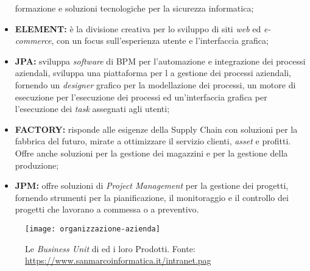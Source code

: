 \begin{itemize}
formazione e soluzioni tecnologiche per la sicurezza informatica;
\item \textbf{ELEMENT:} è la divisione creativa per lo sviluppo di siti \textit{web} ed \textit{e-commerce}, con un focus sull'esperienza utente e 
l'interfaccia grafica;
\item \textbf{JPA:} sviluppa \textit{software} di \gls{BPM} per l'automazione e integrazione dei processi aziendali, sviluppa una piattaforma per l
a gestione dei processi aziendali, fornendo un \textit{designer}  grafico per la modellazione dei processi, un motore di esecuzione per l'esecuzione dei processi ed un'interfaccia grafica per l'esecuzione dei \textit{task} assegnati agli utenti;
\item \textbf{FACTORY:} risponde alle esigenze della \gls{Supply Chain} con soluzioni per la fabbrica del futuro, mirate a ottimizzare il servizio clienti, 
\textit{asset} e profitti. Offre anche soluzioni per la gestione dei magazzini e per la gestione della produzione; 
\item \textbf{JPM:} offre soluzioni di \textit{\gls{Project Management}} per la gestione dei progetti, fornendo strumenti per la pianificazione, 
il monitoraggio e il controllo dei progetti che lavorano a commessa o a preventivo.
\end{itemize}

\begin{figure}[!h] 
  \centering 
  \texttt{[image: organizzazione-azienda]} 
  \caption{Le \textit{Business Unit} di {\azienda} ed i loro Prodotti. Fonte: \url{https://www.sanmarcoinformatica.it/intranet.pag}}
  \label{fig:organizzazione-azienda}
\end{figure}


